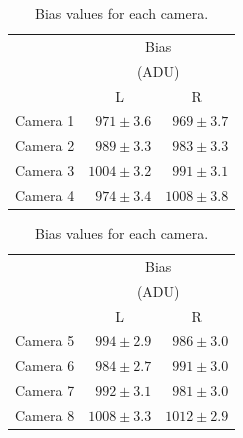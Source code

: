 \begin{colsection}
\begin{table}[t]
    \begin{center}
        \begin{tabular}{c|rr} %
             & \multicolumn{2}{c}{Bias} \\
             & \multicolumn{2}{c}{(ADU)} \\
             & \multicolumn{1}{c}{L} & \multicolumn{1}{c}{R} \\
            \midrule
            Camera 1 & $971\pm3.6$ & $969\pm3.7$ \\
            Camera 2 & $989\pm3.3$ & $983\pm3.3$ \\
            Camera 3 & $1004\pm3.2$ & $991\pm3.1$ \\
            Camera 4 & $974\pm3.4$ & $1008\pm3.8$ \\
        \end{tabular}
        \hspace{0.5cm}
        \begin{tabular}{c|rr} %
             & \multicolumn{2}{c}{Bias} \\
             & \multicolumn{2}{c}{(ADU)} \\
             & \multicolumn{1}{c}{L} & \multicolumn{1}{c}{R} \\
            \midrule
            Camera 5 & $994\pm2.9$ & $986\pm3.0$ \\
            Camera 6 & $984\pm2.7$ & $991\pm3.0$ \\
            Camera 7 & $992\pm3.1$ & $981\pm3.0$ \\
            Camera 8 & $1008\pm3.3$ & $1012\pm2.9$ \\
        \end{tabular}
    \end{center}
    \caption[Bias values]{
        Bias values for each camera.
    }\label{tab:bias}
\end{table}

\end{colsection}


